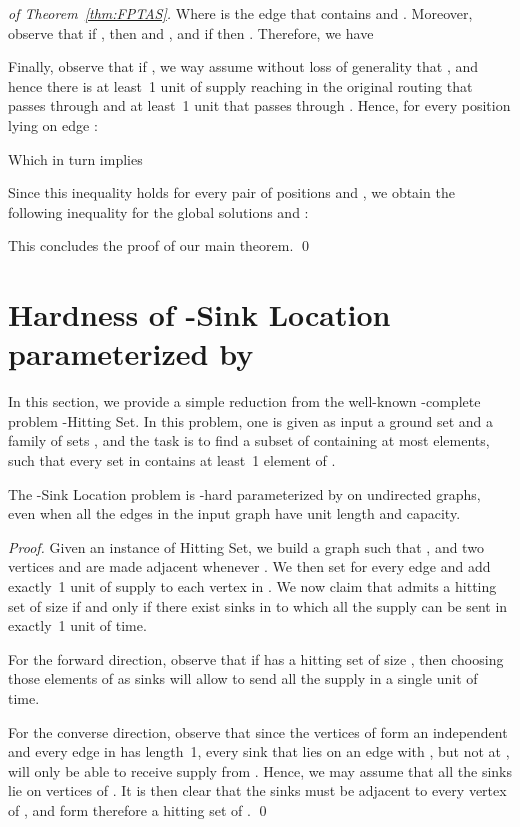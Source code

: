 \documentclass[a4paper,10pt]{llncs}
\begin{document}
\begin{proof}[of Theorem~\ref{thm:FPTAS}]
Where  is the edge that contains  and . Moreover, observe that if , then  and , and if  then .
Therefore, we have

Finally, observe that if , we way assume without loss of generality that , and hence there is at least~1 unit of supply reaching  in the original routing that passes through  and at least~1 unit that passes through . Hence, for every position  lying on edge :

Which in turn implies

Since this inequality holds for every pair of positions  and , we obtain the following inequality for the global solutions  and :

This concludes the proof of our main theorem.
\qed
\end{proof}

\section{Hardness of -{\sc Sink Location} parameterized by }

In this section, we provide a simple reduction from the well-known -complete problem -{\sc Hitting Set}. In this problem, one is given as input a ground set  and a family of sets , and the task is to find a subset  of  containing at most  elements, such that every set in  contains at least~1 element of .

\begin{theorem}
The -{\sc Sink Location} problem is -hard parameterized by  on undirected graphs, even when all the edges in the input graph  have unit length and capacity.
\end{theorem}

\begin{proof}
Given an instance  of {\sc Hitting Set}, we build a graph  such that , and two vertices  and  are made adjacent whenever  . We then set  for every edge  and add exactly~1 unit of supply to each vertex in . We now claim that  admits a hitting set of size  if and only if there exist  sinks in  to which all the supply can be sent in exactly~1 unit of time.

For the forward direction, observe that if  has a hitting set of size , then choosing those  elements of  as sinks will allow to send all the supply in a single unit of time.

For the converse direction, observe that since the vertices of  form an independent and every edge in  has length~1, every sink that lies on an edge  with , but not at , will only be able to receive supply from . Hence, we may assume that all the sinks lie on vertices of . It is then clear that the  sinks must be adjacent to every vertex of , and form therefore a hitting set of . 
\qed
\end{proof}
\end{document}
